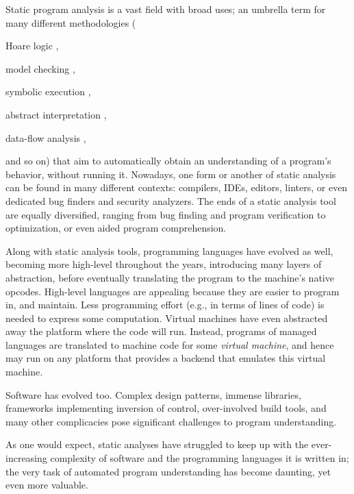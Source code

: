 \label{chapter:intro}

Static program analysis is a vast field with broad uses; an umbrella
term for many different methodologies (%
\begin{inparablank}
  \item Hoare logic
    \cite{journals/cacm/Hoare69,floyd1967assigning,lics:2002/Reynolds,csl/OHearnRY01},
  \item model checking
    \cite{icalp/EmersonC80,lop/ClarkeE81,toplas/ClarkeES86,programm/QueilleS82},
  \item symbolic execution
    \cite{journals/cacm/King76,journals/tse/Howden77,conf/kbse/PasareanuR10,Boyer:1975:SFS:390016.808445},
  \item abstract interpretation
    \cite{popl/CousotC77,journals/jlp/CousotC92,journals/logcom/CousotC92},
  \item data-flow analysis
    \cite{popl/Kildall73,books/daglib/0030999,books/mk/Muchnick1997,journals/acta/KamU77,popl/RepsHS95,books/ph/SharirP81},
\end{inparablank}
and so on) that aim to automatically obtain an
understanding of a program's behavior, without running it. Nowadays,
one form or another of static analysis can be found in many different
contexts: compilers, IDEs, editors, linters, or even dedicated bug
finders and security analyzers. The ends of a static analysis tool are
equally diversified, ranging from bug finding and program
verification to optimization, or even aided program comprehension.

Along with static analysis tools, programming languages have
evolved as well, becoming more high-level throughout the years,
introducing many layers of abstraction, before eventually translating
the program to the machine's native opcodes. High-level languages are
appealing because they are easier to program in, and maintain. Less
programming effort (e.g., in terms of lines of code) is needed to
express some computation. Virtual machines have even abstracted away
the platform where the code will run. Instead, programs of managed
languages are translated to machine code for some \emph{virtual
  machine}, and hence may run on any platform that provides a backend
that emulates this virtual machine.

Software has evolved too. Complex design patterns, immense libraries,
frameworks implementing inversion of control, over-involved build
tools, and many other complicacies pose significant challenges to
program understanding.

As one would expect, static analyses have struggled to keep up with
the ever-increasing complexity of software and the programming
languages it is written in; the very task of automated program
understanding has become daunting, yet even more valuable.

